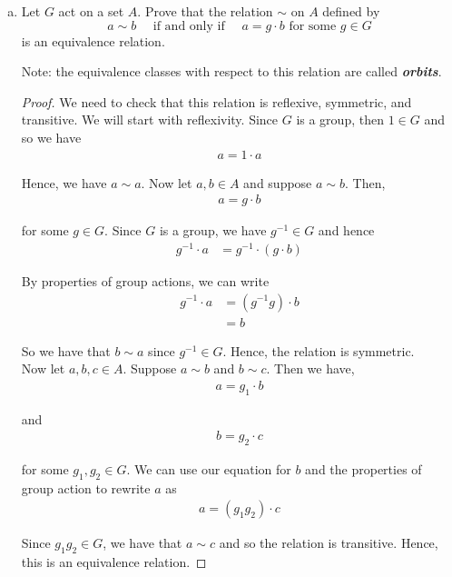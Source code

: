 \documentclass[11pt, reqno]{amsart}
\theoremstyle{plain}
\theoremstyle{definition}
\theoremstyle{example}
\begin{document}
\begin{enumerate}[1.]
\begin{enumerate}[(a)]
\item 
 Let $G$ act on a set $A$. Prove that the relation $\sim$ on $A$ defined by 
$$a \sim b \quad  \text{ if and only if } \quad  a = g \cdot b \text{ for some } g \in G$$
is an equivalence relation. 

\smallskip

Note: the equivalence classes with respect to this relation are called \emph{\bf orbits}.

\begin{proof}
We need to check that this relation is reflexive, symmetric, and transitive. We will start with reflexivity. Since $G$ is a group, then $1 \in G$ and so we have 
\begin{align*}
a = 1 \cdot a
\end{align*}

Hence, we have $a \sim a$. Now let $a, b \in A$ and suppose $a \sim b$. Then,
\begin{align*}
a = g \cdot b
\end{align*}

for some $g \in G$. Since $G$ is a group, we have $g^{-1} \in G$ and hence
\begin{align*}
g^{-1} \cdot a &= g^{-1} \cdot (g \cdot b)
\end{align*}

By properties of group actions, we can write
\begin{align*}
g^{-1} \cdot a &= (g^{-1}g) \cdot b\\
&= b
\end{align*}

So we have that $b \sim a$ since $g^{-1} \in G$. Hence, the relation is symmetric.\\

Now let $a, b, c \in A$. Suppose $a \sim b$ and $b \sim c$. Then we have,
\begin{align*}
a = g _1 \cdot b
\end{align*}

and 
\begin{align*}
b = g_2 \cdot c
\end{align*}

for some $g_1, g_2 \in G$. We can use our equation for $b$ and the properties of group action to rewrite $a$ as
\begin{align*}
a = (g_1g_2) \cdot c
\end{align*}

Since $g_1g_2 \in G$, we have that $a \sim c$ and so the relation is transitive. Hence, this is an equivalence relation.
\end{proof}


\end{enumerate}
\end{enumerate}
\end{document}
